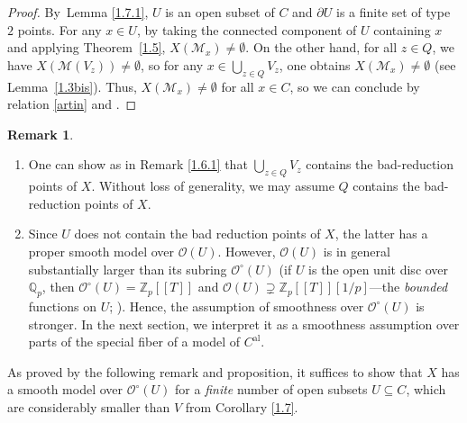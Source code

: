 \documentclass[JEP,XML,SOM,Unicode,NoFloatCountersInSection,published]{cedram}
\newcommand{\lcr}{[\![}
\newcommand{\rcr}{]\!]}
\newcommand{\al}{\mathrm{al}}
\theoremstyle{definition}
\newtheorem{rem}[thm]{Remark}
\begin{document}
\begin{proof}
By~Lemma \ref{1.7.1}, $U$ is an open subset of $C$ and $\partial{U}$ is a finite set of type~$2$ points.
For any $x \in U$, by taking the connected component of $U$ containing $x$ and applying Theorem~\ref{1.5}, $X(\mathscr{M}_x) \neq \emptyset$.
On the other hand, for all $z \in Q$, we have $X(\mathscr{M}(V_z)) \neq \emptyset$, so for any $x \in \bigcup_{z\in Q} V_z$, one obtains $X(\mathscr{M}_x) \neq \emptyset$ (see Lemma~\ref{1.3bis}). Thus, $X(\mathscr{M}_x) \neq \emptyset$ for all $x \in C$, so we can conclude by relation \eqref{artin} and \cite[Cor.\,3.18]{une}.
\end{proof}

\skpt
\begin{rem} \label{1.8}
\begin{enumerate}
\item
One can show as in Remark \ref{1.6.1} that $\bigcup_{z \in Q} V_z$ contains the bad-reduction points of $X$. Without loss of generality, we may assume $Q$ contains the bad-reduction points of $X$.

\item
Since $U$ does not contain the bad reduction points of $X$, the latter has a proper smooth model over $\mathcal{O}(U)$. However, $\mathcal{O}(U)$ is in general substantially larger than its subring $\mathcal{O}^{\circ}(U)$ (\eg if $U$ is the open unit disc over $\mathbb{Q}_p$, then $\mathcal{O}^{\circ}(U)=\mathbb{Z}_p\lcr T\rcr$ and $\mathcal{O}(U) \supsetneq \mathbb{Z}_p\lcr T\rcr[1/p]$---the \emph{bounded} functions on $U$; \cf \cite{mart}). Hence, the assumption of smoothness over $\mathcal{O}^{\circ}(U)$ is stronger.
In the next section, we interpret it as a smoothness assumption over parts of the special fiber of a model of $C^{\al}$.
\end{enumerate}
\end{rem}

As proved by the following remark and proposition, it suffices to show that $X$ has a smooth model over $\mathcal{O}^{\circ}(U)$ for a \emph{finite} number of open subsets $U \subseteq C$, which are considerably smaller than $V$ from Corollary \ref{1.7}.\enlargethispage{\baselineskip}
\end{document}
